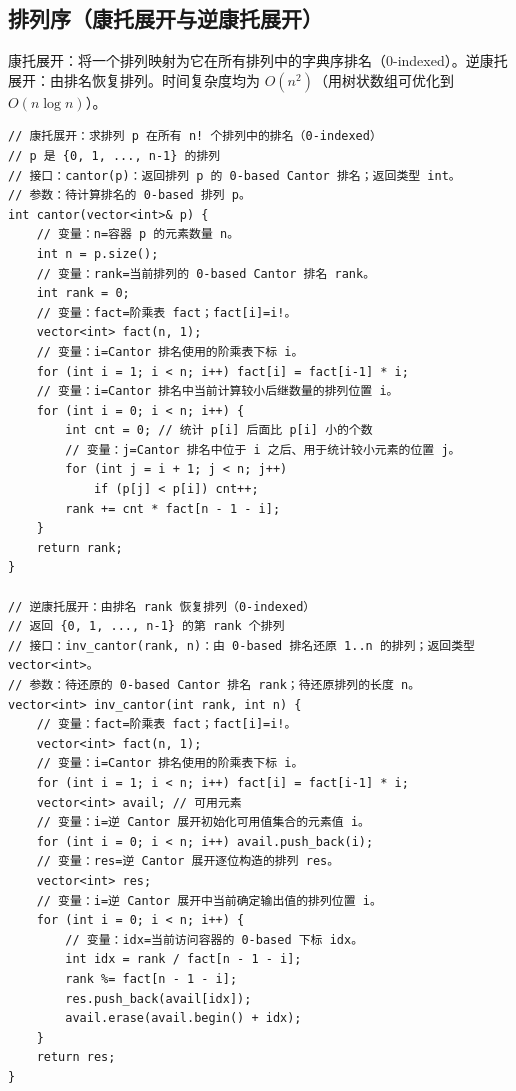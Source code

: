 \documentclass[UTF8,openany,oneside,zihao=-4]{ctexbook}
\begin{document}
\subsection{排列序（康托展开与逆康托展开）}

\begin{note}
康托展开：将一个排列映射为它在所有排列中的字典序排名（0-indexed）。逆康托展开：由排名恢复排列。时间复杂度均为 $O(n^2)$（用树状数组可优化到 $O(n \log n)$）。
\end{note}

\begin{lstlisting}
// 康托展开：求排列 p 在所有 n! 个排列中的排名（0-indexed）
// p 是 {0, 1, ..., n-1} 的排列
// 接口：cantor(p)：返回排列 p 的 0-based Cantor 排名；返回类型 int。
// 参数：待计算排名的 0-based 排列 p。
int cantor(vector<int>& p) {
    // 变量：n=容器 p 的元素数量 n。
    int n = p.size();
    // 变量：rank=当前排列的 0-based Cantor 排名 rank。
    int rank = 0;
    // 变量：fact=阶乘表 fact；fact[i]=i!。
    vector<int> fact(n, 1);
    // 变量：i=Cantor 排名使用的阶乘表下标 i。
    for (int i = 1; i < n; i++) fact[i] = fact[i-1] * i;
    // 变量：i=Cantor 排名中当前计算较小后继数量的排列位置 i。
    for (int i = 0; i < n; i++) {
        int cnt = 0; // 统计 p[i] 后面比 p[i] 小的个数
        // 变量：j=Cantor 排名中位于 i 之后、用于统计较小元素的位置 j。
        for (int j = i + 1; j < n; j++)
            if (p[j] < p[i]) cnt++;
        rank += cnt * fact[n - 1 - i];
    }
    return rank;
}

// 逆康托展开：由排名 rank 恢复排列（0-indexed）
// 返回 {0, 1, ..., n-1} 的第 rank 个排列
// 接口：inv_cantor(rank, n)：由 0-based 排名还原 1..n 的排列；返回类型 vector<int>。
// 参数：待还原的 0-based Cantor 排名 rank；待还原排列的长度 n。
vector<int> inv_cantor(int rank, int n) {
    // 变量：fact=阶乘表 fact；fact[i]=i!。
    vector<int> fact(n, 1);
    // 变量：i=Cantor 排名使用的阶乘表下标 i。
    for (int i = 1; i < n; i++) fact[i] = fact[i-1] * i;
    vector<int> avail; // 可用元素
    // 变量：i=逆 Cantor 展开初始化可用值集合的元素值 i。
    for (int i = 0; i < n; i++) avail.push_back(i);
    // 变量：res=逆 Cantor 展开逐位构造的排列 res。
    vector<int> res;
    // 变量：i=逆 Cantor 展开中当前确定输出值的排列位置 i。
    for (int i = 0; i < n; i++) {
        // 变量：idx=当前访问容器的 0-based 下标 idx。
        int idx = rank / fact[n - 1 - i];
        rank %= fact[n - 1 - i];
        res.push_back(avail[idx]);
        avail.erase(avail.begin() + idx);
    }
    return res;
}
\end{lstlisting}
\end{document}
